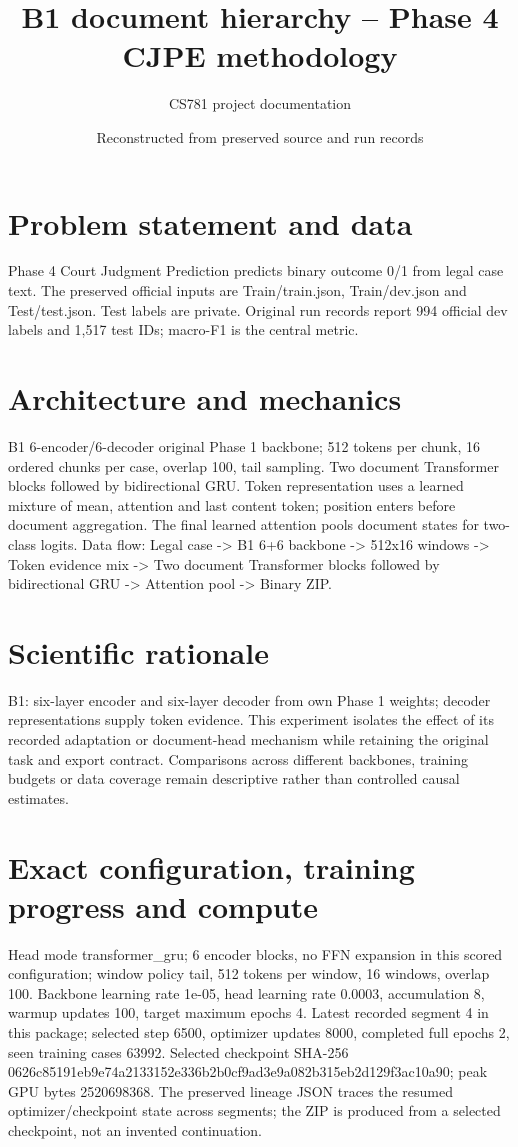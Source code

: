 \documentclass[11pt,a4paper]{article}
\begin{document}
\title{B1 document hierarchy -- Phase 4 CJPE methodology}
\author{CS781 project documentation}
\date{Reconstructed from preserved source and run records}
\maketitle
\section{Problem statement and data}
Phase 4 Court Judgment Prediction predicts binary outcome 0/1 from legal case text. The preserved official inputs are Train/train.json, Train/dev.json and Test/test.json. Test labels are private. Original run records report 994 official dev labels and 1,517 test IDs; macro-F1 is the central metric.
\section{Architecture and mechanics}
B1 6-encoder/6-decoder original Phase 1 backbone; 512 tokens per chunk, 16 ordered chunks per case, overlap 100, tail sampling. Two document Transformer blocks followed by bidirectional GRU. Token representation uses a learned mixture of mean, attention and last content token; position enters before document aggregation. The final learned attention pools document states for two-class logits. Data flow: Legal case -> B1 6+6 backbone -> 512x16 windows -> Token evidence mix -> Two document Transformer blocks followed by bidirectional GRU -> Attention pool -> Binary ZIP.
\section{Scientific rationale}
B1: six-layer encoder and six-layer decoder from own Phase 1 weights; decoder representations supply token evidence. This experiment isolates the effect of its recorded adaptation or document-head mechanism while retaining the original task and export contract. Comparisons across different backbones, training budgets or data coverage remain descriptive rather than controlled causal estimates.
\section{Exact configuration, training progress and compute}
Head mode transformer\_gru; 6 encoder blocks, no FFN expansion in this scored configuration; window policy tail, 512 tokens per window, 16 windows, overlap 100. Backbone learning rate 1e-05, head learning rate 0.0003, accumulation 8, warmup updates 100, target maximum epochs 4. Latest recorded segment 4 in this package; selected step 6500, optimizer updates 8000, completed full epochs 2, seen training cases 63992. Selected checkpoint SHA-256 0626c85191eb9e74a2133152e336b2b0cf9ad3e9a082b315eb2d129f3ac10a90; peak GPU bytes 2520698368. The preserved lineage JSON traces the resumed optimizer/checkpoint state across segments; the ZIP is produced from a selected checkpoint, not an invented continuation.
\end{document}
